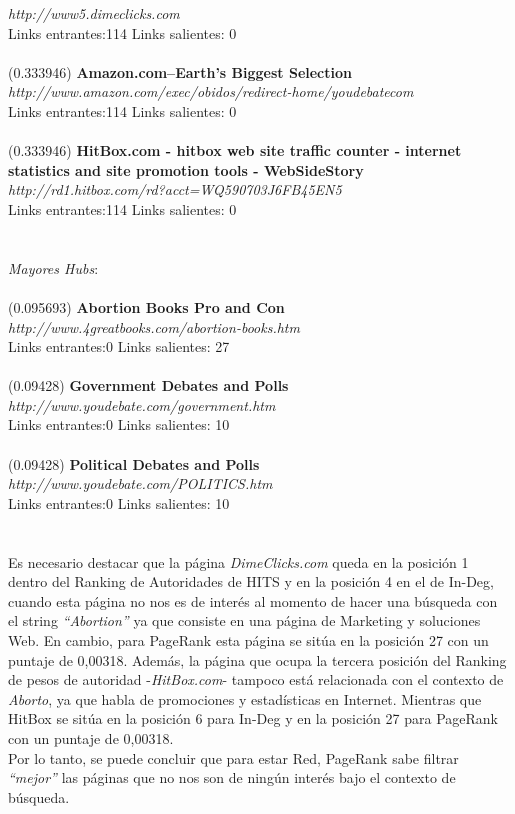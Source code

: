 \documentclass[a4paper]{article}
\begin{document}
\textit{http://www5.dimeclicks.com }\\
Links entrantes:114 \indent Links salientes: 0\\
\\
(0.333946) \textbf{Amazon.com--Earth's Biggest Selection} \\
\textit{http://www.amazon.com/exec/obidos/redirect-home/youdebatecom} \\
Links entrantes:114 \indent Links salientes: 0\\
\\
(0.333946) \textbf{HitBox.com - hitbox web site traffic counter - internet statistics and site promotion tools - WebSideStory} \\
\textit{http://rd1.hitbox.com/rd?acct=WQ590703J6FB45EN5} \\
Links entrantes:114 \indent Links salientes: 0\\
\\
\\
\emph{Mayores Hubs}: \\
\\
(0.095693)\textbf{ Abortion Books Pro and Con} \\
\textit{http://www.4greatbooks.com/abortion-books.htm} \\
Links entrantes:0 \indent Links salientes: 27\\
\\
(0.09428) \textbf{Government Debates and Polls} \\
\textit{http://www.youdebate.com/government.htm }\\
Links entrantes:0 \indent Links salientes: 10\\
\\
(0.09428) \textbf{Political Debates and Polls }\\
\textit{http://www.youdebate.com/POLITICS.htm} \\
Links entrantes:0 \indent Links salientes: 10\\
\\
\\
\indent Es necesario destacar que  la p\'agina \emph{DimeClicks.com} queda en la posici\'on 1 dentro del Ranking de Autoridades de HITS y en la posici\'on 4 en el de In-Deg, cuando esta p\'agina no nos es de inter\'es al momento de hacer una b\'usqueda con el string \textit{``Abortion''} ya que consiste en una p\'agina de Marketing y soluciones Web. En cambio, para PageRank esta p\'agina se sit\'ua en la posici\'on 27 con un puntaje de 0,00318. Adem\'as, la p\'agina que ocupa la tercera posici\'on del Ranking de pesos de autoridad -\emph{HitBox.com}- tampoco est\'a relacionada con el contexto de \emph{Aborto}, ya que habla de promociones y estad\'isticas en Internet. Mientras que HitBox se sit\'ua en la posici\'on 6 para In-Deg y en la posici\'on 27 para PageRank con un puntaje de 0,00318. \\
\indent Por lo tanto, se puede concluir que para estar Red, PageRank sabe filtrar \textit{``mejor''} las p\'aginas que no nos son de ning\'un inter\'es bajo el contexto de b\'usqueda.\\
\end{document}
